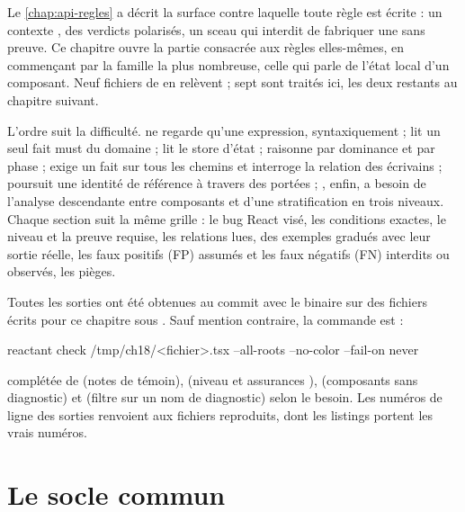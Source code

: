 Le \cref{chap:api-regles} a décrit la surface contre laquelle toute règle est écrite : un contexte , des verdicts polarisés, un sceau qui interdit de fabriquer une \Error{} sans preuve. Ce chapitre ouvre la partie consacrée aux règles elles-mêmes, en commençant par la famille la plus nombreuse, celle qui parle de l'état local d'un composant. Neuf fichiers de  en relèvent ; sept sont traités ici, les deux restants au chapitre suivant.

L'ordre suit la difficulté.  ne regarde qu'une expression, syntaxiquement ;  lit un seul fait must du domaine ;  lit le store d'état ;  raisonne par dominance et par phase ;  exige un fait \og sur tous les chemins\fg{} et interroge la relation des écrivains ;  poursuit une identité de référence à travers des portées ; , enfin, a besoin de l'analyse descendante entre composants et d'une stratification en trois niveaux. Chaque section suit la même grille : le bug React visé, les conditions exactes, le niveau et la preuve requise, les relations lues, des exemples gradués avec leur sortie réelle, les faux positifs (FP) assumés et les faux négatifs (FN) interdits ou observés, les pièges.

Toutes les sorties ont été obtenues au commit \snapshotCommit{} avec le binaire  sur des fichiers écrits pour ce chapitre sous . Sauf mention contraire, la commande est :

\begin{shell}
reactant check /tmp/ch18/<fichier>.tsx --all-roots --no-color --fail-on never
\end{shell}

\noindent complétée de  (notes de témoin),  (niveau \Info{} et assurances ),  (composants sans diagnostic) et  (filtre sur un nom de diagnostic) selon le besoin. Les numéros de ligne des sorties renvoient aux fichiers reproduits, dont les listings portent les vrais numéros.

\section{Le socle commun}
\label{sec:regles-etat-socle}

